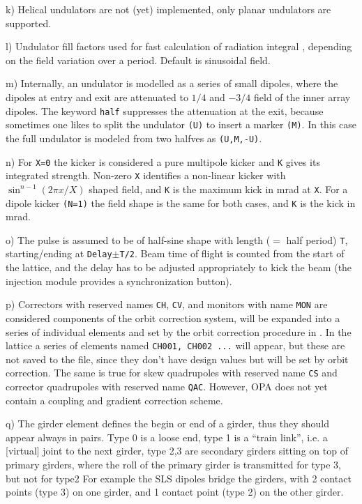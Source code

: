 \documentclass[12pt]{article}
\newcommand\code[1]{{\tt #1}}
\newcommand{\opagui}[1]{\colorbox{blue!20}{{\color{black}\code{#1}}}}
\newcommand{\ogui}[1]{\hyperref[#1]{\opagui{#1}}}
\newcommand{\todo}[1]{{\color{red} #1}}
\begin{document}
k) Helical undulators are not (yet) implemented, only planar undulators are supported.

l) Undulator fill factors used for fast calculation of radiation integral \cite{inside}, depending on the field variation over a period. Default is sinusoidal field. 

m) Internally, an undulator is modelled as a series of small dipoles, where the dipoles at entry and exit are attenuated to $1/4$ and $-3/4$ field of the inner array dipoles. The keyword {\tt half} suppresses the attenuation at the exit, because sometimes one likes to split the undulator {\tt(U)} to insert a marker {\tt(M)}. In this case the full undulator is modeled from two halfves as {\tt(U,M,-U)}.

n) For {\tt X=0} the kicker is considered a pure multipole kicker and {\tt K} gives its integrated strength. Non-zero {\tt X} identifies a non-linear kicker with $\sin^{n-1}(2\pi x/X)$ shaped field, and {\tt K} is the maximum kick in mrad at {\tt X}. For a dipole kicker {\tt (N=1)} the field shape is the same for both cases, and {\tt K} is the kick in mrad.

o) The pulse is assumed to be of half-sine shape with length ($=$ half period) {\tt T}, starting/ending at {\tt Delay$\pm$T/2}. Beam time of flight is counted from the start of the lattice, and the delay has to be adjusted appropriately to kick the beam (the injection module provides a synchronization button).

p) Correctors with reserved names {\tt CH}, {\tt CV}, and monitors with name {\tt MON} are considered components of the orbit correction system, will be expanded into a series of individual elements and set by the orbit correction procedure in \ogui{opaorbit}. In the lattice a series of elements named {\tt CH001, CH002 ...} will appear, but these are not saved to the file, since they don't have design values but will be set by orbit correction. The same is true for skew quadrupoles with reserved name {\tt CS} and corrector quadrupoles with reserved name {\tt QAC}. \todo{However, OPA does not yet contain a coupling and gradient correction scheme.}

q) The girder element defines the begin or end of a girder, thus they should appear always in pairs. Type 0 is a loose end, type 1 is a ``train link'', i.e. a [virtual] joint to the next girder, type 2,3 are secondary girders sitting on top of primary girders, where the roll of the primary girder is transmitted for type 3, but not for type2 For example the SLS dipoles bridge the girders, with 2 contact points (type 3) on one girder, and 1 contact point (type 2) on the other girder.
\end{document}
